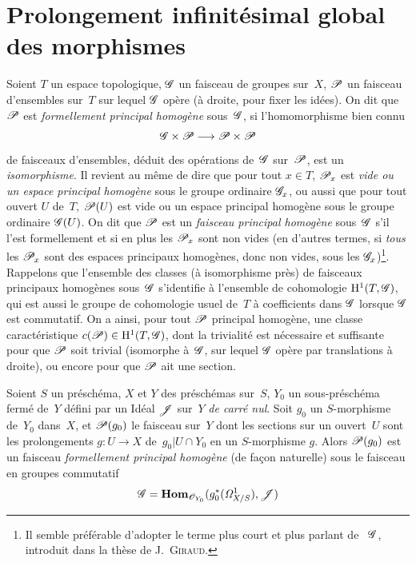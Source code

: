 \section{Prolongement infinit\'esimal global des morphismes}
\label{III.5}

Soient $T$ un espace topologique, $\cal{G}$ un faisceau de groupes
sur~$X$,
$\cal{P}$
un faisceau d'ensembles sur~$T$ sur lequel $\cal{G}$ op\`ere (\`a
droite, pour fixer les id\'ees). On dit que $\cal{P}$ est
\emph{formellement principal homogène}
sous~$\cal{G}$, si l'homomorphisme bien connu
$$
\cal{G}\times \cal{P}\to \cal{P}\times \cal{P}
$$
de faisceaux d'ensembles, d\'eduit des op\'erations de~$\cal{G}$
sur~$\cal{P}$, est un {\emph{isomorphisme}}. Il revient au m\^eme de
dire que pour tout $x\in T$, $\cal{P}_x$ est {\emph{vide ou un espace
principal homogène}} sous le groupe ordinaire $\cal{G}_x$, ou
aussi que pour tout ouvert $U$ de~$T$, $\cal{P}(U)$ est vide ou un
espace principal homog\`ene sous le groupe ordinaire
$\cal{G}(U)$. On dit que
$\cal{P}$
est un {\emph{faisceau principal homogène}}
sous~$\cal{G}$
s'il l'est formellement et si en plus les $\cal{P}_x$ sont non vides
(en d'autres termes, si {\emph{tous}} les $\cal{P}_x$ sont des espaces
principaux homog\`enes,
donc non vides, sous les $\cal{G}_x$)\footnote{Il semble
pr\'ef\'erable d'adopter le terme plus court et plus parlant de
~$\cal{G}$\fg,
introduit dans la th\`ese de J.\, \textsc{Giraud}.}. Rappelons que l'ensemble
des classes (\`a isomorphisme pr\`es) de faisceaux principaux
homog\`enes sous~$\cal{G}$ s'identifie \`a l'ensemble de
cohomologie $\H^1(T,\cal{G})$, qui est aussi le groupe de cohomologie
usuel de~$T$ \`a coefficients dans $\cal{G}$ lorsque $\cal{G}$ est
commutatif. On a ainsi, pour tout $\cal{P}$ principal homog\`ene,
une classe caract\'eristique $c(\cal{P})\in\H^1(T,\cal{G})$, dont la
trivialit\'e est n\'ecessaire et suffisante pour que $\cal{P}$
soit trivial (\ie isomorphe \`a~$\cal{G}$, sur lequel $\cal{G}$
op\`ere par translations \`a droite), ou encore pour que $\cal{P}$
ait une section.

\begin{proposition}
\label{III.5.1}
Soient $S$ un pr\'esch\'ema, $X$ et $Y$ des pr\'esch\'emas
sur~$S$, $Y_0$ un sous-pr\'esch\'ema ferm\'e de~$Y$ d\'efini
par un Id\'eal $\cal{J}$ sur~$Y$ {\emph{de carré nul}}. Soit
$g_0$ un $S$-morphisme de~$Y_0$ dans~$X$, et $\cal{P}(g_0)$ le
faisceau sur~$Y$ dont les sections sur un ouvert~$U$ sont les
prolongements $g\colon U\to X$ de~$g_0|U\cap Y_0$ en un $S$-morphisme
$g$. Alors $\cal{P}(g_0)$ est un faisceau {\emph{formellement
principal homogène}} (de fa\c con naturelle) sous le faisceau
en groupes commutatif
$$
\cal{G}=\SheafHom_{\cal{O}_{Y_0}}(g_0^*(\it{\Omega}^1_{X/S}),\cal{J})
$$
\end{proposition}

